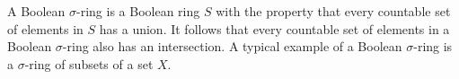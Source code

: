 A Boolean $\sigma$-ring is a Boolean ring $S$ with the property that every countable set of elements in $S$ has a union. It follows that every countable set of elements in a Boolean $\sigma$-ring also has an intersection. A typical example of a Boolean $\sigma$-ring is a $\sigma$-ring of subsets of a set $X$.
